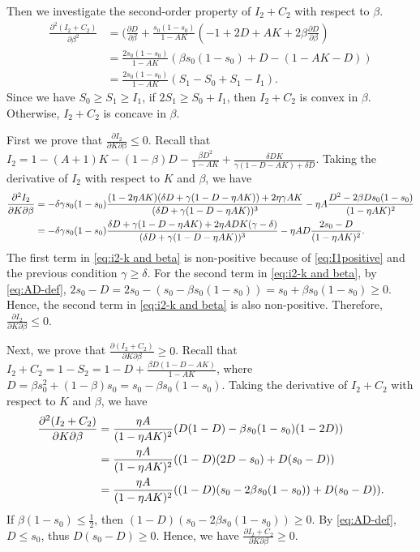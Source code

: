 \documentclass[nonblindrev, copyedit]{informs3a}
\newcounter{prop}[chapter]
\begin{document}
Then we investigate the second-order property of $I_2+C_2$ with respect to $\beta$.
\begin{align*}
    \frac{\partial^2 (I_2+C_2)}{\partial \beta^2}&=(\frac{\partial D}{\partial\beta}+\frac{s_0(1-s_0)}{1-AK}(-1+2D+AK+2\beta\frac{\partial D}{\partial\beta})\\
    &=\frac{2s_0(1-s_0)}{1-AK}(\beta s_0(1-s_0)+D-(1-AK-D))\\
    &=\frac{2s_0(1-s_0)}{1-AK}(S_1-S_0+S_1-I_1).
\end{align*}
Since we have $S_0\ge S_1\ge I_1$, if $2S_1\ge S_0+I_1$, then $I_2+C_2$ is convex in $\beta$. Otherwise, $I_2+C_2$ is concave in $\beta$.\Halmos

First we prove that $\frac{\partial I_2}{\partial K\partial\beta}\le0$. Recall that $I_2=1-(A+1)K-(1-\beta)D-\frac{\beta D^2}{1-AK}+\frac{\delta DK}{\gamma(1-D-AK)+\delta D}$. Taking the derivative of $I_2$ with respect to $K$ and $\beta$, we have
\begin{align}\label{eq:i2-k and beta}
    \frac{\partial^2 I_2}{\partial K\partial\beta}&=-\delta\gamma s_0(1-s_0)\frac{(1-2\eta AK)(\delta D+\gamma(1-D-\eta AK))+2\eta\gamma AK}{(\delta D+\gamma(1-D-\eta AK))^3}-\eta A\frac{D^2-2\beta Ds_0(1-s_0)}{(1-\eta AK)^2}\notag\\
    &=-\delta\gamma s_0(1-s_0)\frac{\delta D+\gamma(1-D-\eta AK)+2\eta ADK(\gamma-\delta)}{(\delta D+\gamma(1-D-\eta AK))^3}-\eta AD\frac{2s_0-D}{(1-\eta AK)^2}.
\end{align}
The first term in \eqref{eq:i2-k and beta} is non-positive because of \eqref{eq:I1positive} and the previous condition $\gamma\ge\delta$. For the second term in \eqref{eq:i2-k and beta}, by \eqref{eq:AD-def}, $2s_0-D=2s_0-(s_0-\beta s_0(1-s_0))=s_0+\beta s_0(1-s_0)\ge0$. Hence, the second term in \eqref{eq:i2-k and beta} is also non-positive. Therefore, $\frac{\partial I_2}{\partial K\partial\beta}\le0$.

Next, we prove that $\frac{\partial (I_2+C_2)}{\partial K\partial\beta}\ge0$. Recall that $I_2+C_2=1-S_2=1-D+\frac{\beta D(1-D-AK)}{1-AK}$, where $D=\beta s_0^2+(1-\beta)s_0=s_0-\beta s_0(1-s_0)$.
Taking the derivative of $I_2+C_2$ with respect to $K$ and $\beta$, we have
\begin{align*}%
    \frac{\partial^2 (I_2+C_2)}{\partial K\partial\beta}&=\frac{\eta A}{(1-\eta AK)^2}(D(1-D)-\beta s_0(1-s_0)(1-2D))\notag\\
    &=\frac{\eta A}{(1-\eta AK)^2}((1-D)(2D-s_0)+D(s_0-D))\notag\\
    &=\frac{\eta A}{(1-\eta AK)^2}((1-D)(s_0-2\beta s_0(1-s_0))+D(s_0-D)).
\end{align*}
If $\beta(1-s_0)\le\frac{1}{2}$, then $(1-D)(s_0-2\beta s_0(1-s_0))\ge0$. By \eqref{eq:AD-def}, $D\le s_0$, thus $D(s_0-D)\ge0$. Hence, we have $\frac{\partial I_2+C_2}{\partial K\partial\beta}\ge0$.\Halmos
\end{document}
